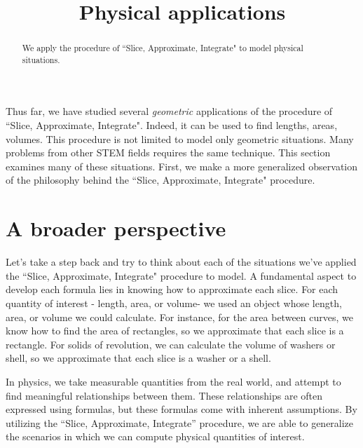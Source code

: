 \documentclass{ximera}
\title[Dig-In:]{Physical applications}
\begin{document}
\begin{abstract}
We apply the procedure of ``Slice, Approximate, Integrate" to model physical situations.
\end{abstract}
\maketitle

Thus far, we have studied several \emph{geometric} applications of the procedure of ``Slice, Approximate, Integrate".  Indeed, it can be used to find lengths, areas, volumes.  This procedure is not limited to model only geometric situations.  Many problems from other STEM fields requires the same technique.  This section examines many of these situations.  First, we make a more generalized observation of the philosophy behind the ``Slice, Approximate, Integrate" procedure.

\section{A broader perspective}
Let's take a step back and try to think about each of the situations we've applied the ``Slice, Approximate, Integrate" procedure to model.  A fundamental aspect to develop each formula lies in knowing how to approximate each slice.  For each quantity of interest - length, area, or volume- we used an object whose length, area, or volume we could calculate.  For instance, for the area between curves, we know how to find the area of rectangles, so we approximate that each slice is a rectangle.  For solids of revolution, we can calculate the volume of washers or shell, so we approximate that each slice is a washer or a shell. 

In physics, we take measurable quantities from the real world, and attempt to find meaningful relationships between them.  These relationships are often expressed using formulas, but these formulas come with inherent assumptions.  By utilizing the ``Slice, Approximate, Integrate'' procedure, we are able to generalize the scenarios in which we can compute physical quantities of interest.
\end{document}
